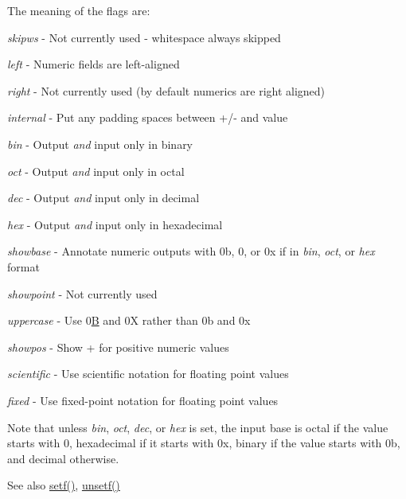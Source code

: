 The meaning of the flags are\+: 
\begin{DoxyItemize}
\item {\itshape skipws} -\/ Not currently used -\/ whitespace always skipped 
\item {\itshape left} -\/ Numeric fields are left-\/aligned 
\item {\itshape right} -\/ Not currently used (by default numerics are right aligned) 
\item {\itshape internal} -\/ Put any padding spaces between +/-\/ and value 
\item {\itshape bin} -\/ Output {\itshape and} input only in binary 
\item {\itshape oct} -\/ Output {\itshape and} input only in octal 
\item {\itshape dec} -\/ Output {\itshape and} input only in decimal 
\item {\itshape hex} -\/ Output {\itshape and} input only in hexadecimal 
\item {\itshape showbase} -\/ Annotate numeric outputs with 0b, 0, or 0x if in {\itshape bin}, {\itshape oct}, or {\itshape hex} format 
\item {\itshape showpoint} -\/ Not currently used 
\item {\itshape uppercase} -\/ Use 0\mbox{\hyperlink{class_b}{B}} and 0X rather than 0b and 0x 
\item {\itshape showpos} -\/ Show + for positive numeric values 
\item {\itshape scientific} -\/ Use scientific notation for floating point values 
\item {\itshape fixed} -\/ Use fixed-\/point notation for floating point values 
\end{DoxyItemize}

Note that unless {\itshape bin}, {\itshape oct}, {\itshape dec}, or {\itshape hex} is set, the input base is octal if the value starts with 0, hexadecimal if it starts with 0x, binary if the value starts with 0b, and decimal otherwise.

\begin{DoxySeeAlso}{See also}
\mbox{\hyperlink{class_q_text_stream_adb71ee168e670b470bcbc547b994c5df}{setf()}}, \mbox{\hyperlink{class_q_text_stream_a7f7cb71e79749c7d13217dec5599e627}{unsetf()}} 
\end{DoxySeeAlso}
\mbox{\label{class_q_text_stream_a280a244baaf87d825ec50bd83c14488c}} 
